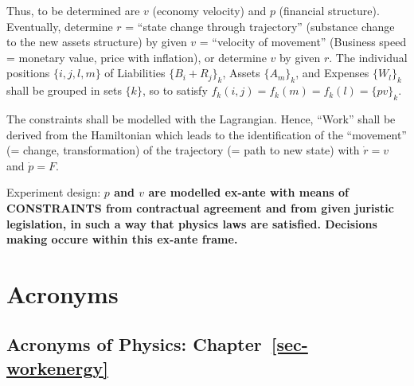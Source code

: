 \documentclass[
  letterpaper,
  DIV=11,
  numbers=noendperiod]{scrartcl}
\begin{document}
Thus, to be determined are \(v\) (economy velocity) and \(p\) (financial
structure). Eventually, determine \(r\) = ``state change through
trajectory'' (substance change to the new assets structure) by given
\(v\) = ``velocity of movement'' (Business speed = monetary value, price
with inflation), or determine \(v\) by given \(r\). The individual
positions \(\{ i,j,l,m \}\) of Liabilities \(\{ B_i + R_j \}_k\), Assets
\(\{ A_m \}_k\), and Expenses \(\{ W_l \}_k\) shall be grouped in sets
\(\{ k \}\), so to satisfy \(f_k(i,j) = f_k(m) = f_k(l) = \{ pv \}_k\).

The constraints shall be modelled with the Lagrangian. Hence, ``Work''
shall be derived from the Hamiltonian which leads to the identification
of the ``movement'' (= change, transformation) of the trajectory (= path
to new state) with \(\dot r = v\) and \(\dot p = F\).

Experiment design: \textbf{\(p\) and \(v\) are modelled ex-ante with
means of CONSTRAINTS from contractual agreement and from given juristic
legislation, in such a way that physics laws are satisfied. Decisions
making occure within this ex-ante frame.}

\hfill\break
\hfill\break

\section{Acronyms}\label{acronyms}

\subsection{\texorpdfstring{Acronyms of Physics:
Chapter~\ref{sec-workenergy}}{Acronyms of Physics: Chapter~}}\label{sec-acroworkenergy}
\end{document}
